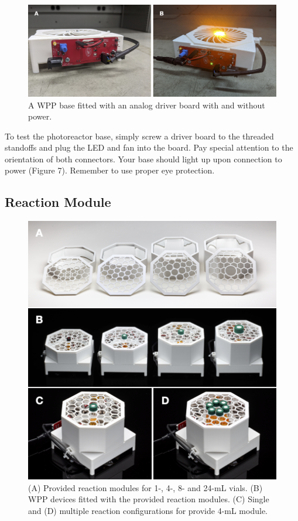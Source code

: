 \documentclass[11pt]{article}
\begin{document}
\begin{figure}[H]
	\includegraphics[width=\textwidth]{"./fig7.png"}
	\caption{A WPP base fitted with an analog driver board with and without power.}
\end{figure}

To test the photoreactor base, simply screw a driver board to the threaded standoffs and plug the LED and fan into the board.
Pay special attention to the orientation of both connectors.
Your base should light up upon connection to power (Figure 7).
Remember to use proper eye protection.

\clearpage

\subsection{Reaction Module} \label{SEC:enclosure}

\begin{figure}[H]
	\includegraphics[width=\textwidth]{"./fig8.png"}
	\caption{(A) Provided reaction modules for 1-, 4-, 8- and 24-mL vials. (B) WPP devices fitted with the provided reaction modules. (C) Single and (D) multiple reaction configurations for provide 4-mL module.}
\end{figure}
\end{document}
